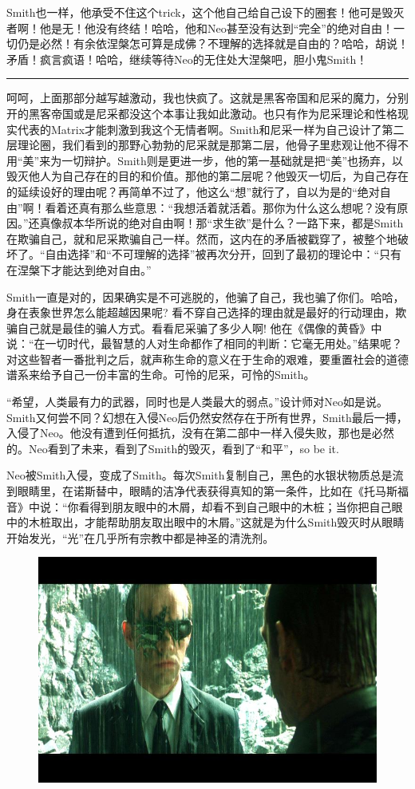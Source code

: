 \documentclass[UTF8]{ctexart}
\newcommand{\myparsep}{\noindent \rule[0.5ex]{\linewidth}{1pt}}
\begin{document}
Smith也一样，他承受不住这个trick，这个他自己给自己设下的圈套！他可是毁灭者啊！他是无！他没有终结！哈哈，他和Neo甚至没有达到“完全”的绝对自由！一切仍是必然！有余依涅槃怎可算是成佛？不理解的选择就是自由的？哈哈，胡说！矛盾！疯言疯语！哈哈，继续等待Neo的无住处大涅槃吧，胆小鬼Smith！

\myparsep

呵呵，上面那部分越写越激动，我也快疯了。这就是黑客帝国和尼采的魔力，分别开的黑客帝国或是尼采都没这个本事让我如此激动。也只有作为尼采理论和性格现实代表的Matrix才能刺激到我这个无情者啊。Smith和尼采一样为自己设计了第二层理论圈，我们看到的那野心勃勃的尼采就是那第二层，他骨子里悲观让他不得不用“美”来为一切辩护。Smith则是更进一步，他的第一基础就是把“美”也扬弃，以毁灭他人为自己存在的目的和价值。那他的第二层呢？他毁灭一切后，为自己存在的延续设好的理由呢？再简单不过了，他这么“想”就行了，自以为是的“绝对自由”啊！看着还真有那么些意思：“我想活着就活着。那你为什么这么想呢？没有原因。”还真像叔本华所说的绝对自由啊！那“求生欲”是什么？一路下来，都是Smith在欺骗自己，就和尼采欺骗自己一样。然而，这内在的矛盾被戳穿了，被整个地破坏了。“自由选择”和“不可理解的选择”被再次分开，回到了最初的理论中：“只有在涅槃下才能达到绝对自由。”

Smith一直是对的，因果确实是不可逃脱的，他骗了自己，我也骗了你们。哈哈，身在表象世界怎么能超越因果呢? 看不穿自己选择的理由就是最好的行动理由，欺骗自己就是最佳的骗人方式。看看尼采骗了多少人啊! 他在《偶像的黄昏》中说：“在一切时代，最智慧的人对生命都作了相同的判断：它毫无用处。”结果呢？对这些智者一番批判之后，就声称生命的意义在于生命的艰难，要重置社会的道德谱系来给予自己一份丰富的生命。可怜的尼采，可怜的Smith。

“希望，人类最有力的武器，同时也是人类最大的弱点。”设计师对Neo如是说。Smith又何尝不同？幻想在入侵Neo后仍然安然存在于所有世界，Smith最后一搏，入侵了Neo。他没有遭到任何抵抗，没有在第二部中一样入侵失败，那也是必然的。Neo看到了未来，看到了Smith的毁灭，看到了“和平”，so be it.

Neo被Smith入侵，变成了Smith。每次Smith复制自己，黑色的水银状物质总是流到眼睛里，在诺斯替中，眼睛的洁净代表获得真知的第一条件，比如在《托马斯福音》中说：“你看得到朋友眼中的木屑，却看不到自己眼中的木桩；当你把自己眼中的木桩取出，才能帮助朋友取出眼中的木屑。”这就是为什么Smith毁灭时从眼睛开始发光，“光”在几乎所有宗教中都是神圣的清洗剂。

\begin{figure}[htb]
\centering
\includegraphics[width=0.5\linewidth]{fig/ee8e55e7cb08d72db8382024.jpg}
\end{figure}
\end{document}
